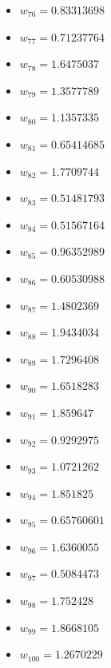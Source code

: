 \documentclass[11pt]{article}
\begin{document}
\begin{itemize}
\item $w_{76} = 0.83313698$
\item $w_{77} = 0.71237764$
\item $w_{78} = 1.6475037$
\item $w_{79} = 1.3577789$
\item $w_{80} = 1.1357335$
\item $w_{81} = 0.65414685$
\item $w_{82} = 1.7709744$
\item $w_{83} = 0.51481793$
\item $w_{84} = 0.51567164$
\item $w_{85} = 0.96352989$
\item $w_{86} = 0.60530988$
\item $w_{87} = 1.4802369$
\item $w_{88} = 1.9434034$
\item $w_{89} = 1.7296408$
\item $w_{90} = 1.6518283$
\item $w_{91} = 1.859647$
\item $w_{92} = 0.9292975$
\item $w_{93} = 1.0721262$
\item $w_{94} = 1.851825$
\item $w_{95} = 0.65760601$
\item $w_{96} = 1.6360055$
\item $w_{97} = 0.5084473$
\item $w_{98} = 1.752428$
\item $w_{99} = 1.8668105$
\item $w_{100} = 1.2670229$
\end{itemize}
\end{document}
